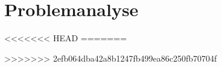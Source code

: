 \chapter{Problemanalyse}
\label{cha:problemanalyse}





<<<<<<< HEAD
=======

>>>>>>> 2efb064dba42a8b1247fb499ea86c250fb70704f
